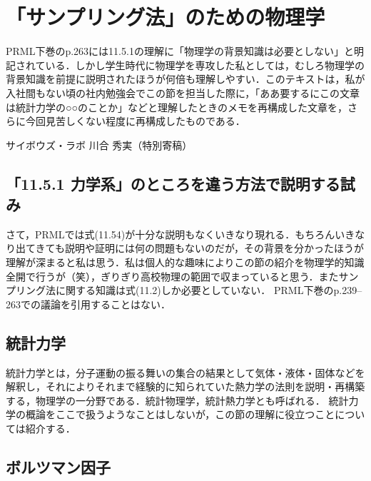 \setcounter{chapter}{10}
\chapter{「サンプリング法」のための物理学}

PRML下巻のp.263には11.5.1の理解に「物理学の背景知識は必要としない」と明記されている．しかし学生時代に物理学を専攻した私としては，むしろ物理学の背景知識を前提に説明されたほうが何倍も理解しやすい．このテキストは，私が入社間もない頃の社内勉強会でこの節を担当した際に，「ああ要するにこの文章は統計力学の○○のことか」などと理解したときのメモを再構成した文章を，さらに今回見苦しくない程度に再構成したものである．
\begin{flushright}
サイボウズ・ラボ  川合 秀実（特別寄稿）
\end{flushright}
\vspace{0pt}

\section{「11.5.1 力学系」のところを違う方法で説明する試み}

さて，PRMLでは式(11.54)が十分な説明もなくいきなり現れる．もちろんいきなり出てきても説明や証明には何の問題もないのだが，その背景を分かったほうが理解が深まると私は思う．私は個人的な趣味によりこの節の紹介を物理学的知識全開で行うが（笑），ぎりぎり高校物理の範囲で収まっていると思う．またサンプリング法に関する知識は式(11.2)しか必要としていない．
PRML下巻のp.239--263での議論を引用することはない．

\section{統計力学}

統計力学とは，分子運動の振る舞いの集合の結果として気体・液体・固体などを解釈し，それによりそれまで経験的に知られていた熱力学の法則を説明・再構築する，物理学の一分野である．統計物理学，統計熱力学とも呼ばれる．
統計力学の概論をここで扱うようなことはしないが，この節の理解に役立つことについては紹介する．

\section{ボルツマン因子}

